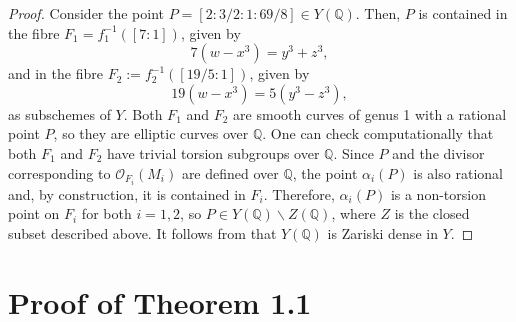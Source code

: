 \documentclass[11pt]{amsart}
\newcommand{\QQ}{\mathbb{Q}}
\theoremstyle{plain}
\theoremstyle{remark}
\begin{document}
\begin{proof}
Consider the point $P = [2: 3/2:1: 69/8]\in Y(\QQ)$. Then, $P$ is contained in the fibre $F_1=f_1^{-1}([7:1])$, given by
\[
7(w-x^3) = y^3+z^3,
\]
and in the fibre $F_2 := f_2^{-1}([19/5:1])$, given by
\[
19(w-x^3)=5(y^3-z^3),
\]
as subschemes of $Y$. Both $F_1$ and $F_2$ are smooth curves of genus 1 with a rational point $P$, so they are elliptic curves over $\QQ$. One can check computationally that both $F_1$ and $F_2$ have trivial torsion subgroups over $\QQ$. Since $P$ and the divisor corresponding to $\mathcal{O}_{F_i}(M_i)$ are defined over $\QQ$, the point $\alpha_i(P)$ is also rational and, by construction, it is contained in $F_i$. Therefore, $\alpha_i(P)$ is a non-torsion point on $F_i$ for both $i=1,2$, so $P\in Y(\QQ)\backslash Z(\QQ)$, where $Z$ is the closed subset described above. It follows from \cite[Proposition 3.8]{twofibs} that $Y(\QQ)$ is Zariski dense in $Y$.
\end{proof}

\section{Proof of Theorem 1.1} \label{thm1}
\end{document}

